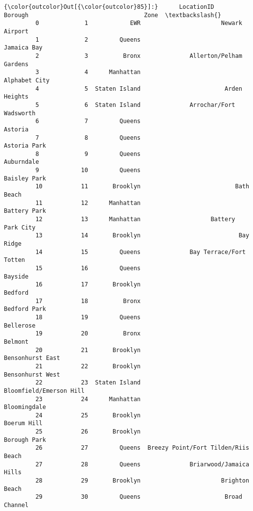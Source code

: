 \documentclass[11pt]{article}
\begin{document}
\begin{Verbatim}[commandchars=\\\{\}]
{\color{outcolor}Out[{\color{outcolor}85}]:}      LocationID        Borough                                 Zone  \textbackslash{}
         0             1            EWR                       Newark Airport   
         1             2         Queens                          Jamaica Bay   
         2             3          Bronx              Allerton/Pelham Gardens   
         3             4      Manhattan                        Alphabet City   
         4             5  Staten Island                        Arden Heights   
         5             6  Staten Island              Arrochar/Fort Wadsworth   
         6             7         Queens                              Astoria   
         7             8         Queens                         Astoria Park   
         8             9         Queens                           Auburndale   
         9            10         Queens                         Baisley Park   
         10           11       Brooklyn                           Bath Beach   
         11           12      Manhattan                         Battery Park   
         12           13      Manhattan                    Battery Park City   
         13           14       Brooklyn                            Bay Ridge   
         14           15         Queens              Bay Terrace/Fort Totten   
         15           16         Queens                              Bayside   
         16           17       Brooklyn                              Bedford   
         17           18          Bronx                         Bedford Park   
         18           19         Queens                            Bellerose   
         19           20          Bronx                              Belmont   
         20           21       Brooklyn                     Bensonhurst East   
         21           22       Brooklyn                     Bensonhurst West   
         22           23  Staten Island              Bloomfield/Emerson Hill   
         23           24      Manhattan                         Bloomingdale   
         24           25       Brooklyn                          Boerum Hill   
         25           26       Brooklyn                         Borough Park   
         26           27         Queens  Breezy Point/Fort Tilden/Riis Beach   
         27           28         Queens              Briarwood/Jamaica Hills   
         28           29       Brooklyn                       Brighton Beach   
         29           30         Queens                        Broad Channel   

\end{Verbatim}
\end{document}
